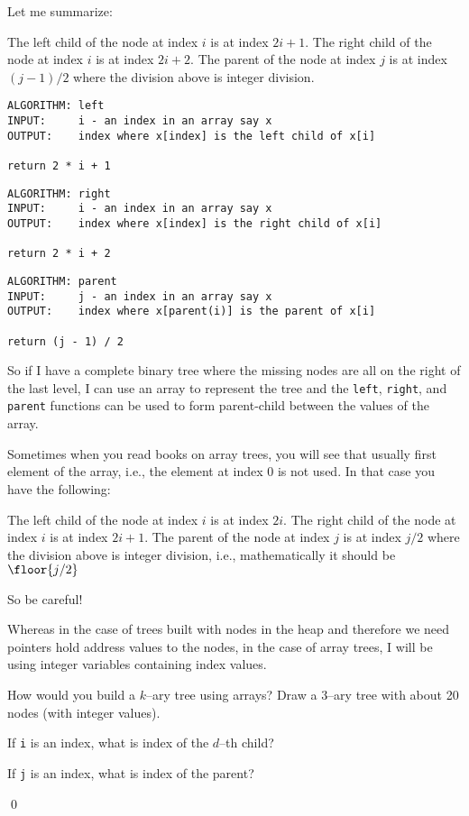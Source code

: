 Let me summarize:
\begin{tightlist}
\li The left child of the node at index $i$ is at index $2i+1$.
\li The right child of the node at index $i$ is at index $2i+2$.
\li The parent of the node at index $j$ is at index $(j - 1)/2$
    where the division above is integer division.
\end{tightlist}


\begin{Verbatim}[frame=single]
ALGORITHM: left
INPUT:     i - an index in an array say x
OUTPUT:    index where x[index] is the left child of x[i]

return 2 * i + 1
\end{Verbatim}
\begin{Verbatim}[frame=single]
ALGORITHM: right
INPUT:     i - an index in an array say x
OUTPUT:    index where x[index] is the right child of x[i]

return 2 * i + 2
\end{Verbatim}
\begin{Verbatim}[frame=single]
ALGORITHM: parent
INPUT:     j - an index in an array say x
OUTPUT:    index where x[parent(i)] is the parent of x[i]

return (j - 1) / 2
\end{Verbatim}

So if I have a complete binary tree where
the missing nodes are all on the right of the last level,
I can use an array to represent the tree
and the \verb!left!, \verb!right!, and \verb!parent!
functions
can be used to form parent-child
between the values of the array.

Sometimes when you read books on array trees, you will see that
usually first element of the array, i.e., the element at
index 0 is not used.
In that case you have the following:
\begin{tightlist}
\li The left child of the node at index $i$ is at index $2i$.
\li The right child of the node at index $i$ is at index $2i+1$.
\li The parent of the node at index $j$ is at index $j / 2$
    where the division above is integer division, i.e., 
    mathematically it should be 
    $\floor{j / 2}$
\end{tightlist}
So be careful!

Whereas in the case of trees built with nodes in the heap
and therefore we need pointers hold address values to the nodes,
in the case of array trees, I will be using integer variables
containing index values.



\newpage
\begin{ex}
How would you build a $k$--ary tree using 
arrays?
Draw a $3$--ary tree with about 20 nodes (with integer values).
\begin{tightlist}
  \item If \texttt{i} is an index, what is index of the $d$--th child?
  \item If \texttt{j} is an index, what is index of the parent?
\end{tightlist}
\qed
\end{ex}
 
